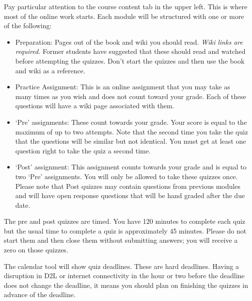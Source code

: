 \documentclass[letterpaper,10pt]{article}
\begin{document}
Pay particular attention to the course content tab in the upper
left. This is where most of the online work starts.  Each module will
be structured with one or more of the following:

\begin{itemize}
\item Preparation: Pages out of the book and wiki you should read.
  \emph{Wiki links are required.}  Former students have suggested that these should read and watched before attempting the quizzes.  Don't start the quizzes and then use the book and wiki as a reference.
  
  \item Practice Assignment: This is an online assignment that you may take as many times as you wish and does not count toward your grade. Each of these questions will have a wiki page associated with them. 

\item `Pre' assignments: These count towards your grade.
  Your score is equal to the maximum of up to two attempts. Note that the second time you take the quiz that the questions will be similar but not identical. You must get at least one question right to take the quiz a second time.

\item `Post' assignment: This assignment counts
  towards your grade and is equal to two `Pre' assignments.  You will
  only be allowed to take these quizzes once.  Please note that Post quizzes may contain questions from previous modules and will have open response questions that will be hand graded after the due date.

 
\end{itemize}

 The pre and post quizzes are timed. You have 120 minutes to complete each quiz but the usual time to complete a quiz is approximately 45 minutes.  Please do not start them and
  then close them without submitting answers; you will receive a zero on those quizzes.  



The calendar tool will show quiz deadlines. These are hard deadlines.  Having a disruption in D2L or internet connectivity in the hour or two before the deadline does not change the deadline, it means you should plan on finishing the quizzes in advance of the deadline.
\end{document}
